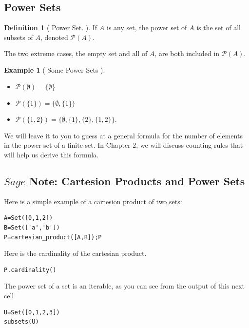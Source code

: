 \documentclass[10pt,]{book}
\theoremstyle{plain}
\theoremstyle{definition}
\newtheorem{definition}[theorem]{Definition}
\newtheorem{example}[theorem]{Example}
\begin{document}
\subsection[Power Sets]{Power Sets}\label{subsection-5}
\begin{definition}[ Power Set. ]\label{power-set}
If \( A\) is any set, the power set of \(A\) is the set of all subsets of \(A\), denoted \(\mathcal{P}(A)\).\end{definition}
\label{notation-7}
\par
The two extreme cases, the empty set and all of \(A\), are both included in \(\mathcal{P}(A)\).%
\begin{example}[ Some Power Sets ]\label{Some_Power_Sets}
\leavevmode%
\begin{itemize}[label=\textbullet]
\item{}\(\mathcal{P}(\emptyset )=\{\emptyset \}\) \item{} \(\mathcal{P}(\{1\}) = \{\emptyset , \{1\}\}\) \item{} \(\mathcal{P}(\{1,2\}) = \{\emptyset , \{1\}, \{2\}, \{1, 2\}\}\). \end{itemize}
We will leave it to you to guess at a general formula for the number of elements in the power set of a finite set. In Chapter 2, we will discuss counting rules that will help us derive this formula.%
\end{example}
\typeout{************************************************}
\typeout{************************************************}
\subsection[ \( Sage\) Note: Cartesion Products and Power Sets]{ \( Sage\) Note: Cartesion Products and Power Sets}\label{subsubsection-2}
Here is a simple example of a cartesion product of two sets:%
\begin{lstlisting}[style=sageinput]
A=Set([0,1,2])
B=Set(['a','b'])
P=cartesian_product([A,B]);P
\end{lstlisting}
\par
Here is the cardinality of the cartesian product.%
\begin{lstlisting}[style=sageinput]
P.cardinality()
\end{lstlisting}
\par

The power set of a set is an iterable, as you can see from the output of this next cell
%
\begin{lstlisting}[style=sageinput]
U=Set([0,1,2,3])
subsets(U)
\end{lstlisting}
\par
\end{document}

